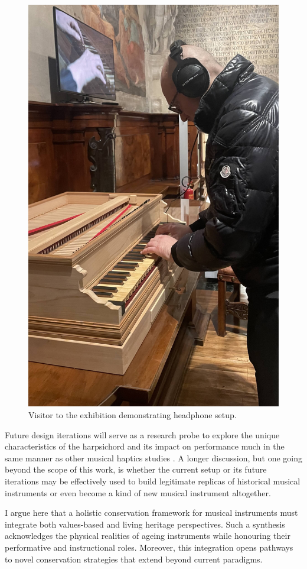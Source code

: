 \begin{figure}
    \centering
    \includegraphics[width=0.33\linewidth]{img/exhibition-user-1.jpeg}
    \caption{Visitor to the exhibition demonstrating headphone setup.}
    \label{fig:user}
\end{figure}


Future design iterations will serve as a research probe to explore the unique characteristics of the harpsichord and its impact on performance much in the same manner as other musical haptics studies \cite{charalampos-saitis_musical_2018}. A longer discussion, but one going beyond the scope of this work, is whether the current setup or its future iterations may be effectively used to build legitimate replicas of historical musical instruments or even become a kind of new musical instrument altogether.

I argue here that a holistic conservation framework for musical instruments must integrate both values-based and living heritage perspectives. Such a synthesis acknowledges the physical realities of ageing instruments while honouring their performative and instructional roles. Moreover, this integration opens pathways to novel conservation strategies that extend beyond current paradigms.

